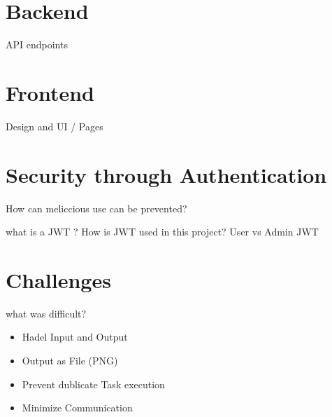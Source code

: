 \section{Backend}
\label{sec:implementation:backend}
API endpoints 

\section{Frontend}
\label{sec:implementation:frontend}
Design and UI / Pages

\section{Security through Authentication}
\label{sec:implementation:authentication}
How can meliccious use can be prevented?

what is a JWT ? How is JWT used in this project? User vs Admin JWT

\section{Challenges}
\label{sec:implementation:challenges}
what was difficult?
\begin{itemize}
    \item Hadel Input and Output
    \item Output as File (PNG)
    \item Prevent dublicate Task execution
    \item Minimize Communication
\end{itemize}